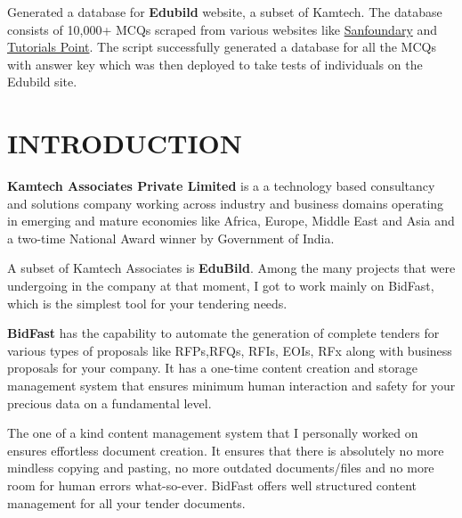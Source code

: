 \documentclass[14pt]{extarticle}
\newcommand\mainmatter{
    \cleardoublepage
    \pagenumbering{arabic}
}
\begin{document}
Generated a database for \textbf{Edubild} website, a subset of Kamtech. The database consists of 10,000+ MCQs scraped from various websites like \href{https:\\www.sanfoundary.com}{Sanfoundary} and \href{https:\\www.tutorialspoint.com}{Tutorials Point}. The script successfully generated a database for all the MCQs with answer key which was then deployed to take tests of individuals on the Edubild site.

\setlength{\parskip}{0em}

\newpage
{}
\begin{center}
    \tableofcontents
\end{center}

\mainmatter

\setlength{\parskip}{1em}

\newpage
\section{INTRODUCTION}

\par \textbf{Kamtech Associates Private Limited} is a a technology based consultancy and solutions company working across industry and business domains operating in emerging and mature economies like Africa, Europe, Middle East and Asia and a two-time National Award winner by Government of India.

\par A subset of Kamtech Associates is \textbf{EduBild}. Among the many projects that were undergoing in the company at that moment, I got to work mainly on BidFast, which is the simplest tool for your tendering needs.

\par \textbf{BidFast} has the capability to automate the generation of complete tenders for various types of proposals like RFPs,RFQs, RFIs, EOIs, RFx along with business proposals for your company. It has a one-time content creation and storage management system that ensures minimum human interaction and safety for your precious data on a fundamental level.

\par The one of a kind content management system that I personally worked on ensures effortless document creation. It ensures that there is absolutely no more mindless copying and pasting, no more outdated documents/files and no more room for human errors what-so-ever. BidFast offers well structured content management for all your tender documents.
\end{document}
